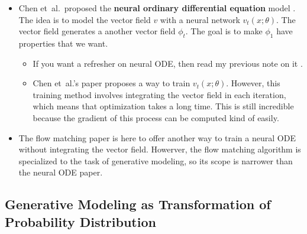 \documentclass[10pt]{article}
\newcommand{\etal}{{et~al.}}
\begin{document}
\begin{itemize}
  \item Chen \etal\ proposed the {\bf neural ordinary differential equation} model \cite{Chen:2019}. The idea is to model the vector field $v$ with a neural network $v_t(x;\theta)$. The vector field generates a another vector field $\phi_t$. The goal is to make $\phi_1$ have properties that we want.
  \begin{itemize}        
    \item If you want a refresher on neural ODE, then read my previous note on it \cite{Khungurn:neuralODE}.    
    \item Chen \etal's paper proposes a way to train $v_t(x;\theta)$. However, this training method involves integrating the vector field in each iteration, which means that optimization takes a long time. This is still incredible because the gradient of this process can be computed kind of easily.
  \end{itemize}

  \item The flow matching paper is here to offer another way to train a neural ODE without integrating the vector field. Howerver, the flow matching algorithm is specialized to the task of generative modeling, so its scope is narrower than the neural ODE paper.
\end{itemize}

\subsection{Generative Modeling as Transformation of Probability Distribution}
\end{document}
